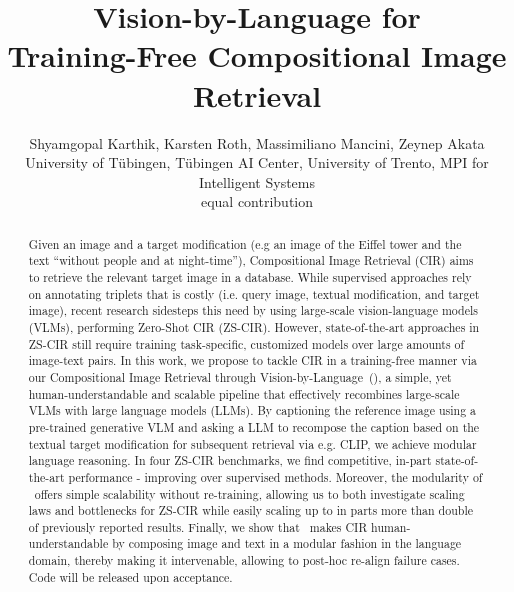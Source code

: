 \documentclass{article} \usepackage{iclr2024_conference,times}
\title{Vision-by-Language for \\Training-Free Compositional Image Retrieval}
\author{Shyamgopal Karthik, Karsten Roth, Massimiliano Mancini, Zeynep Akata\\
\small{University of Tübingen, Tübingen AI Center, University of Trento, MPI for Intelligent Systems}\\
\small{equal contribution}
}
\newcommand{\acronym}{{Compositional Image Retrieval through Vision-by-Language}}
\begin{document}
\maketitle



\begin{abstract}
Given an image and a target modification (e.g an image of the Eiffel tower and the text ``without people and at night-time''), Compositional Image Retrieval (CIR) aims to retrieve the relevant target image in a database. While supervised approaches rely on annotating triplets that is costly (i.e. query image, textual modification, and target image), recent research sidesteps this need by using large-scale vision-language models (VLMs), performing Zero-Shot CIR (ZS-CIR). However, state-of-the-art approaches in ZS-CIR still require training task-specific, customized models over large amounts of image-text pairs. In this work, we propose to tackle CIR in a training-free manner via our \acronym\ (\methodNameNS), a simple, yet human-understandable and scalable pipeline that effectively recombines large-scale VLMs with large language models (LLMs). By captioning the reference image using a pre-trained generative VLM and asking a LLM to recompose the caption based on the textual target modification for subsequent retrieval via e.g. CLIP, we achieve modular language reasoning. In four ZS-CIR benchmarks, we find competitive, in-part state-of-the-art performance - improving over supervised methods. Moreover, the modularity of \methodNameNS\ offers simple scalability without re-training, allowing us to both investigate scaling laws and bottlenecks for ZS-CIR while easily scaling up to in parts more than double of previously reported results.  Finally, we show that \methodNameNS\ makes CIR human-understandable by composing image and text in a modular fashion in the language domain, thereby making it intervenable, allowing to post-hoc re-align failure cases. Code will be released upon acceptance.
\end{abstract}
\end{document}
